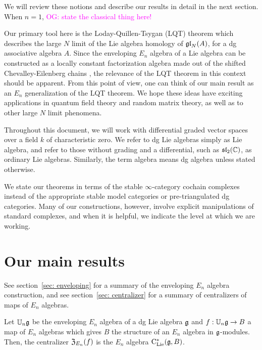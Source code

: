 \documentclass[11pt]{amsart}
\numberwithin{equation}{section}
\def\owen{\textcolor{magenta}{OG: }\textcolor{magenta}}
\begin{document}
We will review these notions and describe our results in detail in the next section. When $n=1$,  \owen{state the classical thing here!}

Our primary tool here is the Loday-Quillen-Tsygan (LQT) theorem which describes the large $N$ limit of the Lie algebra homology of $\frak{gl}_N(A)$, for a dg associative algebra $A$. Since the enveloping $E_n$ algebra of a Lie algebra can be constructed as a locally constant factorization algebra made out of the shifted Chevalley-Eilenberg chains \cite{}, the relevance of the LQT theorem in this context  should be apparent. From this point of view, one can think of our main result as an $E_n$ generalization of the LQT theorem. We hope these ideas have exciting applications in quantum field theory and random matrix theory, as well as to other large $N$ limit phenomena.

\begin{rmk}
Throughout this document, we will work with differential graded vector spaces over a field $k$ of characteristic zero. We refer to dg Lie algebras simply as Lie algebra, and refer to those without grading and a differential, such as $\frak{sl}_2(\mathbb C)$, as ordinary Lie algebras. Similarly, the term algebra means dg algebra unless stated otherwise.
\end{rmk}

\begin{rmk}
We state our theorems in terms of the stable $\infty$-category cochain complexes instead of the appropriate stable model categories or pre-triangulated dg categories. Many of our constructions, however, involve explicit manipulations of standard complexes, and when it is helpful, we indicate the level at which we are working.
\end{rmk}





\section{Our main results}

See section~\ref{sec: enveloping} for a summary of the enveloping $E_n$ algebra construction, and see section~\ref{sec: centralizer} for a summary of centralizers of maps of $E_n$ algebras.

\begin{thm}
\label{thm: centralizer}
Let $\mathbb U_n \mathfrak g$ be the enveloping $E_n$ algebra of a dg Lie algebra $\mathfrak g$ and $f: \mathbb U_n \mathfrak g \to B$ a map of $E_n$ algebras which gives $B$ the structure of an $E_n$ algebra in $\mathfrak g$-modules. Then, the centralizer ${\frak Z}_{E_n}(f)$ is the $E_n$ algebra ${\rm C}_{\rm Lie}^*(\mathfrak g, B)$.
\end{thm}
\end{document}
